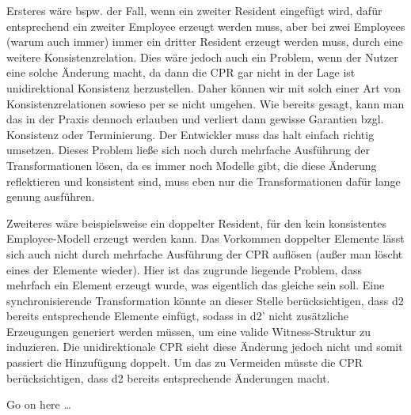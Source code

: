 Ersteres wäre bspw. der Fall, wenn ein zweiter Resident eingefügt wird, dafür entsprechend ein zweiter Employee erzeugt werden muss, aber bei zwei Employees (warum auch immer) immer ein dritter Resident erzeugt werden muss, durch eine weitere Konsistenzrelation. Dies wäre jedoch auch ein Problem, wenn der Nutzer eine solche Änderung macht, da dann die CPR gar nicht in der Lage ist unidirektional Konsistenz herzustellen. Daher können wir mit solch einer Art von  Konsistenzrelationen sowieso per se nicht umgehen. Wie bereits gesagt, kann man das in der Praxis dennoch erlauben und verliert dann gewisse Garantien bzgl. Konsistenz oder Terminierung. Der Entwickler muss das halt einfach richtig umsetzen.
Dieses Problem ließe sich noch durch mehrfache Ausführung der Transformationen lösen, da es immer noch Modelle gibt, die diese Änderung reflektieren und konsistent sind, muss eben nur die Transformationen dafür lange genung ausführen.

Zweiteres wäre beispielsweise ein doppelter Resident, für den kein konsistentes Employee-Modell erzeugt werden kann.
Das Vorkommen doppelter Elemente lässt sich auch nicht durch mehrfache Ausführung der CPR auflösen (außer man löscht eines der Elemente wieder).
Hier ist das zugrunde liegende Problem, dass mehrfach ein Element erzeugt wurde, was eigentlich das gleiche sein soll.
Eine synchronisierende Transformation könnte an dieser Stelle berücksichtigen, dass d2 bereits entsprechende Elemente einfügt, sodass in d2' nicht zusätzliche Erzeugungen generiert werden müssen, um eine valide Witness-Struktur zu induzieren.
Die unidirektionale CPR sieht diese Änderung jedoch nicht und somit passiert die Hinzufügung doppelt.
Um das zu Vermeiden müsste die CPR berücksichtigen, dass d2 bereits entsprechende Änderungen macht.

Go on here \dots





